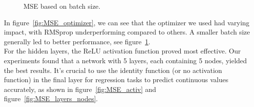 \documentclass[twoside,11pt]{report}
\begin{document}
\begin{figure}[!ht]
\begin{minipage}[t]{0.5\textwidth - 1mm}
\begin{center}
            \end{center}
            \caption
            {
                MSE based on batch size.
            }\label{fig:MSE_batch}
        \end{minipage}
    \end{figure}

    \noindent
    In figure~\ref{fig:MSE_optimizer}, we can see that 
    the optimizer we used had varying impact, with RMSprop underperforming compared to others. 
    A smaller batch size generally led to better performance, see figure~\ref{fig:MSE_batch}.\\
    
    \noindent
    For the hidden layers, the ReLU activation function proved most effective. Our experiments 
    found that a network with 5 layers, each containing 5 nodes, yielded the best results. It's crucial to 
    use the identity function (or no activation function) in the final layer for regression tasks to predict 
    continuous values accurately, as shown in figure~\ref{fig:MSE_activ} and figure~\ref{fig:MSE_layers_nodes}.\\
\end{document}
